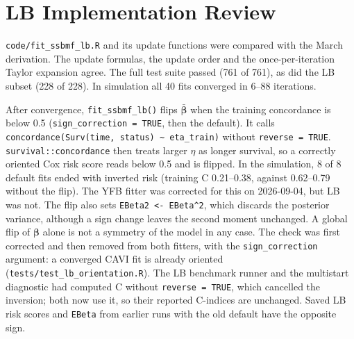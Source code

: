 \documentclass[11pt]{article}
\begin{document}
\section{LB Implementation Review}\label{sec:lbcode}

\texttt{code/fit\_ssbmf\_lb.R} and its update functions were compared with the
March derivation. The update formulas, the update order and the once-per-iteration
Taylor expansion agree. The full test suite passed (761 of 761), as did the LB
subset (228 of 228). In simulation all 40 fits converged in 6--88 iterations.

\begin{issuebox}
After convergence, \texttt{fit\_ssbmf\_lb()} flips $\bar{\bm\beta}$ when the training
concordance is below 0.5 (\texttt{sign\_correction = TRUE}, then the default). It calls
\texttt{concordance(Surv(time, status) \textasciitilde{} eta\_train)} without
\texttt{reverse = TRUE}. \texttt{survival::concordance} then treats larger $\eta$ as
longer survival, so a correctly oriented Cox risk score reads below 0.5 and is
flipped. In the simulation, 8 of 8 default fits ended with inverted risk (training
C 0.21--0.38, against 0.62--0.79 without the flip). The YFB fitter was corrected
for this on 2026-09-04, but LB was not. The flip also sets
\texttt{EBeta2 <- EBeta\^{}2}, which discards the posterior variance, although a
sign change leaves the second moment unchanged. A global flip of $\bm\beta$ alone is
not a symmetry of the model in any case. The check was first corrected and then
removed from both fitters, with the \texttt{sign\_correction} argument: a converged
CAVI fit is already oriented (\texttt{tests/test\_lb\_orientation.R}). The LB
benchmark runner and the multistart diagnostic had computed C without
\texttt{reverse = TRUE}, which cancelled the inversion; both now use it, so their
reported C-indices are unchanged. Saved LB risk scores and \texttt{EBeta} from
earlier runs with the old default have the opposite sign.
\end{issuebox}
\end{document}
